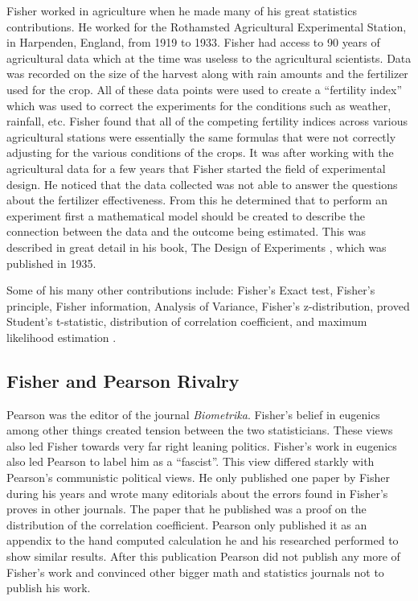 \documentclass{article}
\begin{document}
Fisher worked in agriculture when he made many of his great statistics contributions.
He worked for the Rothamsted Agricultural Experimental Station, in Harpenden, England, from 1919 to 1933.
Fisher had access to 90 years of agricultural data which at the time was useless to the agricultural scientists.
Data was recorded on the size of the harvest along with rain amounts and the fertilizer used for the crop.
All of these data points were used to create a ``fertility index'' which was used to correct the experiments for the conditions such as weather, rainfall, etc.
Fisher found that all of the competing fertility indices across various agricultural stations were essentially the same formulas that were not correctly adjusting for the various conditions of the crops.
It was after working with the agricultural data for a few years that Fisher started the field of experimental design.
He noticed that the data collected was not able to answer the questions about the fertilizer effectiveness.
From this he determined that to perform an experiment first a mathematical model should be created to describe the connection between the data and the outcome being estimated.
This was described in great detail in his book, The Design of Experiments \cite{fisher:1935}, which was published in 1935.

Some of his many other contributions include: Fisher's Exact test, Fisher's principle, Fisher information, Analysis of Variance, Fisher's z-distribution, proved Student's t-statistic, distribution of correlation coefficient, and maximum likelihood estimation \cite{wiki:fisher}.

\subsection{Fisher and Pearson Rivalry}
Pearson was the editor of the journal \textit{Biometrika}.
Fisher's belief in eugenics among other things created tension between the two statisticians.
These views also led Fisher towards very far right leaning politics.
Fisher's work in eugenics also led Pearson to label him as a ``fascist''.
This view differed starkly with Pearson's communistic political views.
He only published one paper by Fisher during his years and wrote many editorials about the errors found in Fisher's proves in other journals.
The paper that he published was a proof on the distribution of the correlation coefficient.
Pearson only published it as an appendix to the hand computed calculation he and his researched performed to show similar results.
After this publication Pearson did not publish any more of Fisher's work and convinced other bigger math and statistics journals not to publish his work.
\end{document}
